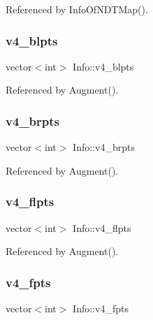 Referenced by Info\+Of\+N\+D\+T\+Map().

\mbox{\label{structInfo_ab14116ddeedb6f25e87d23b26beee05c}} 
\subsubsection{\texorpdfstring{v4\+\_\+blpts}{v4\_blpts}}
{\footnotesize\ttfamily vector$<$int$>$ Info\+::v4\+\_\+blpts}



Referenced by Augment().

\mbox{\label{structInfo_a7b8fd964aebb52cf8569e30fc19ff4ec}} 
\subsubsection{\texorpdfstring{v4\+\_\+brpts}{v4\_brpts}}
{\footnotesize\ttfamily vector$<$int$>$ Info\+::v4\+\_\+brpts}



Referenced by Augment().

\mbox{\label{structInfo_a4562ff86533d50b0abce1d007111040b}} 
\subsubsection{\texorpdfstring{v4\+\_\+flpts}{v4\_flpts}}
{\footnotesize\ttfamily vector$<$int$>$ Info\+::v4\+\_\+flpts}



Referenced by Augment().

\mbox{\label{structInfo_a0e526db15dbaf49f82c6b4898e67d771}} 
\subsubsection{\texorpdfstring{v4\+\_\+fpts}{v4\_fpts}}
{\footnotesize\ttfamily vector$<$int$>$ Info\+::v4\+\_\+fpts}



